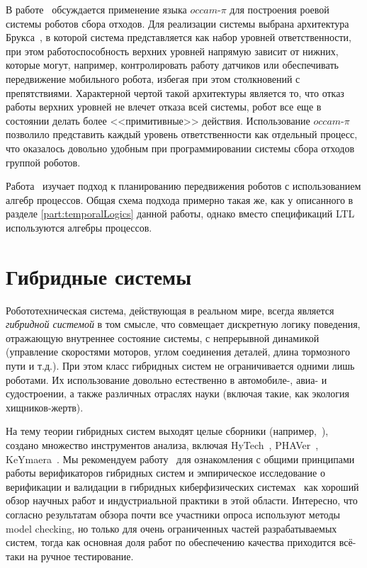 \documentclass[a4, 14pt]{article}
\begin{document}
В работе~\cite{posso2011process} обсуждается применение языка $occam\mbox{-}\pi$ для 
построения роевой~\cite{csahin2005swarm} системы роботов сбора отходов. 
Для реализации системы выбрана архитектура Брукса~\cite{brooks1986layered}, в 
которой система представляется как набор уровней ответственности, при этом 
работоспособность верхних уровней напрямую зависит от нижних, которые могут, 
например, контролировать работу датчиков или обеспечивать передвижение 
мобильного робота, избегая при этом столкновений с препятствиями. Характерной 
чертой такой архитектуры является то, что отказ работы верхних уровней не влечет 
отказа всей системы, робот все еще в состоянии делать более <<примитивные>> 
действия. Использование $occam\mbox{-}\pi$ позволило представить каждый уровень 
ответственности как отдельный процесс, что оказалось довольно удобным при 
программировании системы сбора отходов группой роботов.

Работа~\cite{varricchio2014sampling} изучает подход к планированию передвижения 
роботов с использованием алгебр процессов. Общая схема подхода примерно такая 
же, как у описанного в разделе \ref{part:temporalLogics} данной работы, однако 
вместо спецификаций LTL используются алгебры процессов.

\section{Гибридные системы}
Робототехническая система, действующая в реальном мире, всегда является 
\textit{гибридной системой} в том смысле, что совмещает дискретную логику поведения, 
отражающую внутреннее состояние системы, с непрерывной динамикой (управление 
скоростями моторов, углом соединения деталей, длина тормозного пути и т.д.). 
При этом класс гибридных систем не ограничивается одними лишь роботами. Их 
использование довольно естественно в автомобиле-, авиа- и судостроении, а также 
различных отраслях науки (включая такие, как экология хищников-жертв).

На тему теории гибридных систем выходят целые сборники 
(например,~\cite{vaandrager1999hybrid, lynch2007hybrid}), 
создано множество инструментов анализа, включая HyTech~\cite{henzinger1997hytech}, 
PHAVer~\cite{frehse2005phaver}, KeYmaera~\cite{platzer2008keymaera}. 
Мы рекомендуем работу~\cite{alur1995algorithmic} для ознакомления с общими 
принципами работы верификаторов гибридных систем и эмпирическое исследование о верификации 
и валидации в гибридных киберфизических системах~\cite{zheng2015perceptions}
как хороший обзор научных работ и индустриальной практики в этой области. Интересно,
что согласно результатам обзора почти все участники опроса используют методы model checking,
но только для очень ограниченных частей разрабатываемых систем, тогда как основная доля
работ по обеспечению качества приходится всё-таки на ручное тестирование.
\end{document}
